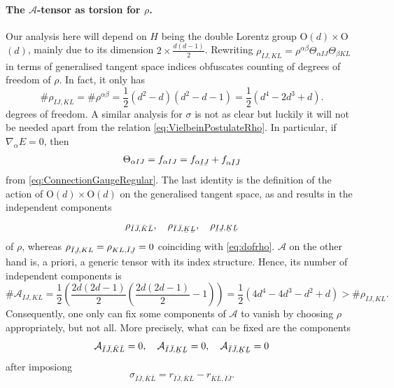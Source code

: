 \documentclass[11pt,a4paper]{article}
\numberwithin{equation}{section}
\newcommand{\ubar}[1]{\underaccent{\bar}{#1}}
\newcommand{\bI}{\bar{I}}
\newcommand{\bJ}{\bar{J}}
\newcommand{\bK}{\bar{K}}
\newcommand{\bL}{\bar{L}}
\newcommand{\ubI}{\ubar{I}}
\newcommand{\ubJ}{\ubar{J}}
\newcommand{\ubK}{\ubar{K}}
\newcommand{\ubL}{\ubar{L}}
\begin{document}
\paragraph{The $\mathcal{A}$-tensor as torsion for $\rho$.} Our analysis here will depend on $H$ being the double Lorentz group O$(d)\times$O$(d)$, mainly due to its dimension $2\times \frac{d(d-1)}{2}$. Rewriting $\rho_{IJ,KL} = \rho^{\alpha \beta} \Theta_{\alpha IJ} \Theta_{\beta KL}$ in terms of generalised tangent space indices obfuscates counting of degrees of freedom of $\rho$. In fact, it only has
\begin{equation}
    \# \rho_{IJ,KL} = \# \rho^{\alpha \beta} = \frac{1}{2}  (d^2 -d ) (d^2 - d  - 1) = \frac{1}{2} ( d^4 - 2d^3 + d) . \label{eq:dofrho}
\end{equation}
degrees of freedom. A similar analysis for $\sigma$ is not as clear but luckily it will not be needed apart from the relation \eqref{eq:VielbeinPostulateRho}. In particular, if $\nabla_\alpha E = 0$, then 
\begin{align}
    \Theta_{\alpha IJ} = f_{\alpha IJ} = f_{\alpha \ubI \ubJ} + f_{\alpha \bI \bJ}
\end{align}
from \eqref{eq:ConnectionGaugeRegular}. The last identity is the definition of the action of O$(d) \times $O$(d)$ on the generalised tangent space, as \cite{Polacek:2013nla} and results in the independent components
\begin{equation}
    \rho_{\bI\bJ,\bK\bL}, \quad \rho_{\bI\bJ,\ubK\ubL}, \quad \rho_{\ubI \ubJ,\ubK \ubL}
\end{equation}
of $\rho$, whereas $\rho_{\bI\ubJ,KL} = \rho_{KL,\bI\ubJ} = 0$ coinciding with \eqref{eq:dofrho}. $\mathcal{A}$ on the other hand is, a priori, a generic tensor with its index structure. Hence, its number of independent components is
\begin{equation}
    \# \mathcal{A}_{IJ,KL} = \frac{1}{2} \left( \frac{2d(2d-1)}{2} \left( \frac{2d(2d-1)}{2} - 1 \right) \right) = \frac{1}{2} ( 4d^4 - 4d^3 - d^2 + d) > \# \rho_{IJ,KL}. \nonumber
\end{equation}
Consequently, one only can fix some components of $\mathcal{A}$ to vanish by choosing $\rho$ appropriately, but not all. More precisely, what can be fixed are the components
\begin{equation}
    \mathcal{A}_{\bI\bJ,\bK\bL}=0, \quad \mathcal{A}_{\bI\bJ,\ubK\ubL} = 0, \quad \mathcal{A}_{\bI\bJ,\ubK\ubL} = 0
\end{equation}
after imposiong
\begin{equation}
    \sigma_{\bI\bJ,\bK\bL} = r_{\bI\bJ,\bK\bL} - r_{\bK\bL,\bI\bJ}.
\end{equation}
\end{document}
